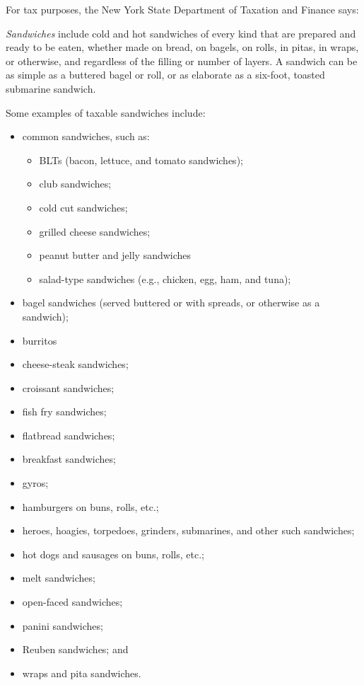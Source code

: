 For tax purposes, the New York State Department of Taxation and Finance \cite{taxDefinition} says:
\begin{displayquote}
	\textit{Sandwiches} include cold and hot sandwiches of every kind that are prepared and ready to be eaten, whether made on bread, on bagels, on rolls, in pitas, in wraps, or otherwise, and regardless of the filling or number of layers. A sandwich can be as simple as a buttered bagel or roll, or as elaborate as a six-foot, toasted submarine sandwich.

	Some examples of taxable sandwiches include:
	\begin{itemize}
		\item common sandwiches, such as:
		\begin{itemize}
			\item BLTs (bacon, lettuce, and tomato sandwiches);
			\item club sandwiches;
			\item cold cut sandwiches;
			\item grilled cheese sandwiches;
			\item peanut butter and jelly sandwiches
			\item salad-type sandwiches (e.g., chicken, egg, ham, and tuna);
		\end{itemize}
		\item bagel sandwiches (served buttered or with spreads, or otherwise as a sandwich);
		\item burritos
		\item cheese-steak sandwiches;
		\item croissant sandwiches;
		\item fish fry sandwiches;
		\item flatbread sandwiches;
		\item breakfast sandwiches;
		\item gyros;
		\item hamburgers on buns, rolls, etc.;
		\item heroes, hoagies, torpedoes, grinders, submarines, and other such sandwiches;
		\item hot dogs and sausages on buns, rolls, etc.;
		\item melt sandwiches;
		\item open-faced sandwiches;
		\item panini sandwiches;
		\item Reuben sandwiches; and
		\item wraps and pita sandwiches.
	\end{itemize}
\end{displayquote}

